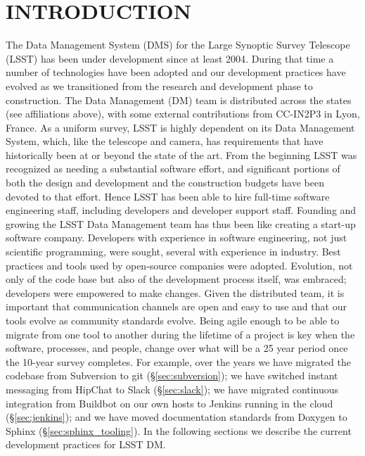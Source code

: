 \section{INTRODUCTION}

The Data Management System (DMS)\cite{2015arXiv151207914J} for the Large Synoptic Survey Telescope (LSST) \cite{2008arXiv0805.2366I} has been under development since at least 2004\cite{2004AAS...20510811A}.
During that time a number of technologies have been adopted and our development practices have evolved as we transitioned from the research and development phase to construction.
The Data Management (DM) team is distributed across the states (see affiliations above),  with some external contributions from CC-IN2P3 in Lyon, France.
As a uniform survey, LSST is highly dependent on its Data Management System, which, like the telescope and camera, has requirements that have historically been at or beyond the state of the art.
From the beginning LSST was recognized as needing a substantial software effort, and significant portions of both the design and development and the construction budgets have been devoted to that effort.
Hence LSST has been able to hire full-time software engineering staff, including developers and developer support staff.
Founding and growing the LSST Data Management team has thus been like creating a start-up software company.
Developers with experience in software engineering, not just scientific programming, were sought, several with experience in industry.
Best practices and tools used by open-source companies were adopted.
Evolution, not only of the code base but also of the development process itself, was embraced; developers were empowered to make changes.
Given the distributed team, it is important that communication channels are open and easy to use and that our tools evolve as community standards evolve.
Being agile enough to be able to migrate from one tool to another during the lifetime of a project is key when the software, processes, and people, change over what will be a 25 year period once the 10-year survey completes.
For example, over the years we have migrated the codebase from Subversion to git (\S\ref{sec:subversion}); we have switched instant messaging from HipChat to Slack (\S\ref{sec:slack}); we have migrated continuous integration from Buildbot on our own hosts to Jenkins running in the cloud (\S\ref{sec:jenkins}); and we have moved documentation standards from Doxygen to Sphinx (\S\ref{sec:sphinx_tooling}).
In the following sections we describe the current development practices for LSST DM.
